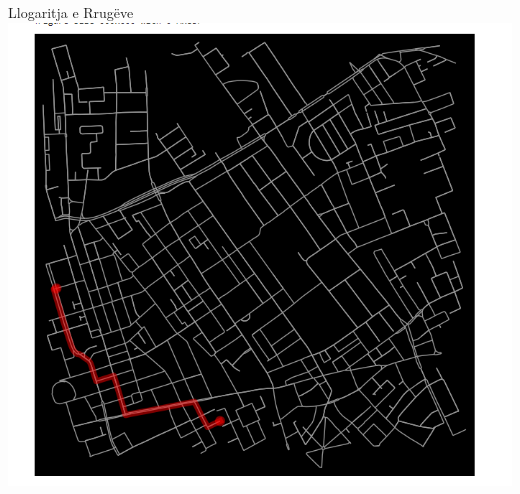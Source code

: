 \documentclass[
  ignorenonframetext,
]{beamer}
\begin{document}
\begin{frame}{Llogaritja e Rrugëve}
\protect\hypertarget{llogaritja-e-rruguxebve-1}{}
\includegraphics{./Figs/rrugshkurter.png}
\end{frame}
\end{document}
